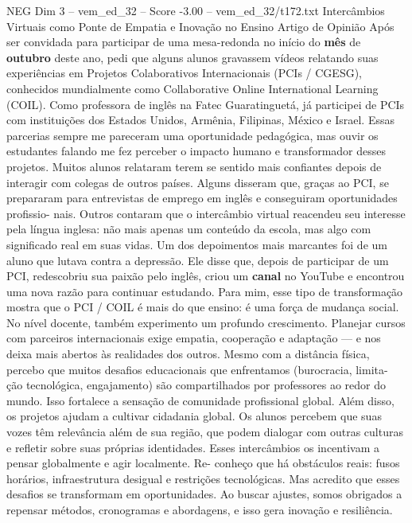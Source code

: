 \begin{textsample}{NEG Dim 3 – vem\_ed\_32 – Score -3.00 – vem\_ed\_32/t172.txt}  \label{ex:f3_neg_002}
Intercâmbios Virtuais como Ponte de Empatia e Inovação no Ensino Artigo de Opinião Após ser convidada para participar de uma mesa-redonda no início do \textbf{mês} de \textbf{outubro} deste ano, pedi que alguns alunos gravassem vídeos relatando suas experiências em Projetos Colaborativos Internacionais (PCIs / CGESG), conhecidos mundialmente como Collaborative Online International Learning (COIL).
Como professora de inglês na Fatec Guaratinguetá, já participei de PCIs com instituições dos Estados Unidos, Armênia, Filipinas, México e Israel.
Essas parcerias sempre me pareceram uma oportunidade pedagógica, mas ouvir os estudantes falando me fez perceber o impacto humano e transformador desses projetos.
Muitos alunos relataram terem se sentido mais confiantes depois de interagir com colegas de outros países.
Alguns disseram que, graças ao PCI, se prepararam para entrevistas de emprego em inglês e conseguiram oportunidades profissio- nais.
Outros contaram que o intercâmbio virtual reacendeu seu interesse pela língua inglesa: não mais apenas um conteúdo da escola, mas algo com significado real em suas vidas.
Um dos depoimentos mais marcantes foi de um aluno que lutava contra a depressão.
Ele disse que, depois de participar de um PCI, redescobriu sua paixão pelo inglês, criou um \textbf{canal} no YouTube e encontrou uma nova razão para continuar estudando.
Para mim, esse tipo de transformação mostra que o PCI / COIL é mais do que ensino: é uma força de mudança social.
No nível docente, também experimento um profundo crescimento.
Planejar cursos com parceiros internacionais exige empatia, cooperação e adaptação — e nos deixa mais abertos às realidades dos outros.
Mesmo com a distância física, percebo que muitos desafios educacionais que enfrentamos (burocracia, limita- ção tecnológica, engajamento) são compartilhados por professores ao redor do mundo.
Isso fortalece a sensação de comunidade profissional global.
Além disso, os projetos ajudam a cultivar cidadania global.
Os alunos percebem que suas vozes têm relevância além de sua região, que podem dialogar com outras culturas e refletir sobre suas próprias identidades.
Esses intercâmbios os incentivam a pensar globalmente e agir localmente.
Re- conheço que há obstáculos reais: fusos horários, infraestrutura desigual e restrições tecnológicas.
Mas acredito que esses desafios se transformam em oportunidades.
Ao buscar ajustes, somos obrigados a repensar métodos, cronogramas e abordagens, e isso gera inovação e resiliência.

\end{textsample}
